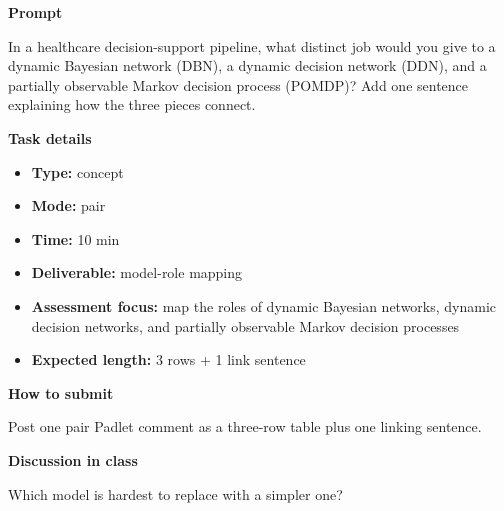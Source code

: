 \documentclass[11pt]{article}
\begin{document}
\begin{tcolorbox}[colback=white,colframe=MidnightBlue,title={Q1 Core Concept Check},fonttitle=\bfseries,breakable]
\begin{center}
\end{center}

{\large\bfseries\color{MidnightBlue} Prompt}\par\medskip
In a healthcare decision-support pipeline, what distinct job would you give to a dynamic Bayesian network (DBN), a dynamic decision network (DDN), and a partially observable Markov decision process (POMDP)? Add one sentence explaining how the three pieces connect.

{\large\bfseries\color{MidnightBlue} Task details}\par\medskip
\begin{itemize}\item \textbf{Type:} concept
\item \textbf{Mode:} pair
\item \textbf{Time:} 10 min
\item \textbf{Deliverable:} model-role mapping
\item \textbf{Assessment focus:} map the roles of dynamic Bayesian networks, dynamic decision networks, and partially observable Markov decision processes
\item \textbf{Expected length:} 3 rows + 1 link sentence\end{itemize}

{\large\bfseries\color{MidnightBlue} How to submit}\par\medskip
Post one pair Padlet comment as a three-row table plus one linking sentence.

{\large\bfseries\color{MidnightBlue} Discussion in class}\par\medskip
Which model is hardest to replace with a simpler one?


\end{tcolorbox}
\end{document}
